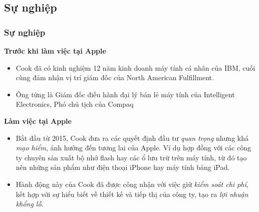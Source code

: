 \documentclass[10pt]{beamer}
\begin{document}
\subsection{Sự nghiệp}
\begin{frame}
\transsplitverticalout
\frametitle{Sự nghiệp}
\pause
\textbf{Trước khi làm việc tại Apple}
\begin{itemize}
\item Cook đã có kinh nghiệm 12 năm kinh doanh máy tính cá nhân của IBM, cuối cùng đảm nhận vị trí giám đốc của North American Fulfillment.
\item Ông từng là Giám đốc điều hành đại lý bán lẻ máy tính của Intelligent Electronics, Phó chủ tịch của Compaq
\end{itemize}
\pause
\vspace{10pt}
\textbf{Làm việc tại Apple}
\begin{itemize}
\item Bắt đầu từ 2015, Cook đưa ra các quyết định đầu tư \emph{quan trọng} nhưng khá \emph{mạo hiểm}, ảnh hưởng đến tương lai của Apple. Ví dụ hợp đồng với các công ty chuyên sản xuất bộ nhớ flash hay các ổ lưu trữ trên máy tính, từ đó tạo nên những sản phẩm như điện thoại iPhone hay máy tính bảng iPad.
\item Hành động này của Cook đã được công nhận với việc giữ \textit{kiểm soát chi phí}, kết hợp với sự hiểu biết về thiết kế và tiếp thị của công ty, tạo ra \textit{lợi nhuận khổng lồ}.
\end{itemize}
\end{frame}
\end{document}
